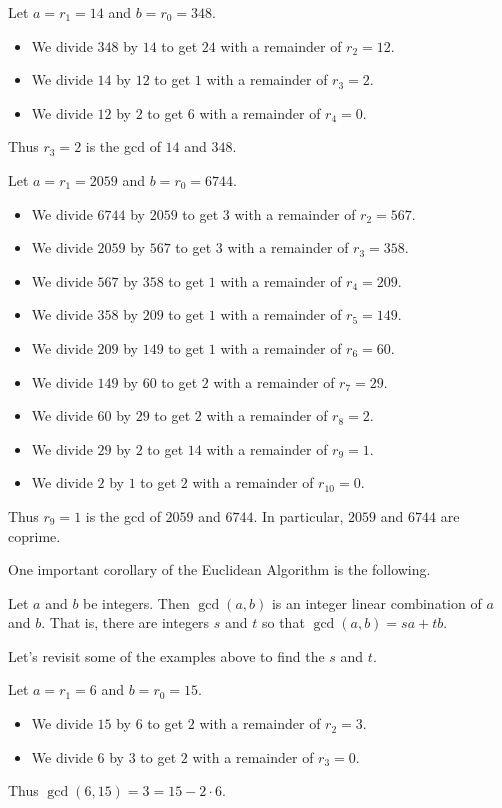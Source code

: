 \documentclass[11pt,dvipsnames]{book}
\numberwithin{equation}{section} %
\numberwithin{figure}{section} %
\numberwithin{table}{section} %
\begin{document}
\begin{example}
Let $a = r_1 = 14$ and $b = r_0 = 348$.
\begin{itemize}
    \item We divide $348$ by $14$ to get $24$ with a remainder of $r_2=12$.
    \item We divide $14$ by $12$ to get $1$ with a remainder of $r_3 = 2$.
    \item We divide $12$ by $2$ to get $6$ with a remainder of $r_4 = 0$.
\end{itemize}
Thus $r_3 = 2$ is the gcd of $14$ and $348$.
\end{example}

\begin{example}
Let $a = r_1 = 2059$ and $b = r_0 = 6744$.
\begin{itemize}
    \item We divide $6744$ by $2059$ to get $3$ with a remainder of $r_2=567$.
    \item We divide $2059$ by $567$ to get $3$ with a remainder of $r_3 = 358$.
    \item We divide $567$ by $358$ to get $1$ with a remainder of $r_4 = 209$.
    \item We divide $358$ by $209$ to get $1$ with a remainder of $r_5 = 149$.
    \item We divide $209$ by $149$ to get $1$ with a remainder of $r_6 = 60$.
    \item We divide $149$ by $60$ to get $2$ with a remainder of $r_7 = 29$.
    \item We divide $60$ by $29$ to get $2$ with a remainder of $r_8 = 2$.
    \item We divide $29$ by $2$ to get $14$ with a remainder of $r_9 = 1$.
    \item We divide $2$ by $1$ to get $2$ with a remainder of $r_{10} = 0$.
\end{itemize}
Thus $r_9 = 1$ is the gcd of $2059$ and $6744$.
In particular, $2059$ and $6744$ are coprime.
\end{example}

One important corollary of the Euclidean Algorithm is the following.
\begin{theorem}
\label{t:lincombgcd}
 Let $a$ and $b$ be integers.
 Then $\gcd(a,b)$ is an integer linear combination of $a$ and $b$.
 That is, there are integers $s$ and $t$ so that $\gcd(a,b)=sa+tb$. 
\end{theorem}

Let's revisit some of the examples above to find the $s$ and $t$.
\begin{example}
Let $a = r_1 = 6$ and $b = r_0 = 15$.
\begin{itemize}
    \item We divide $15$ by $6$ to get $2$ with a remainder of $r_2=3$.
    \item We divide $6$ by $3$ to get $2$ with a remainder of $r_3 = 0$.
\end{itemize}
Thus $\gcd(6,15) = 3 = 15-2\cdot 6$.
\end{example}
\end{document}
